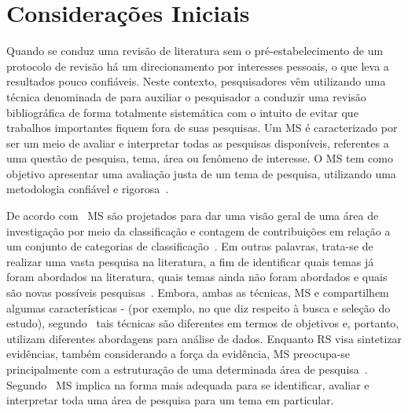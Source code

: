 \section{Considerações Iniciais}

Quando se conduz uma revisão de literatura sem o pré-estabelecimento de um protocolo de revisão há um direcionamento por interesses pessoais, o que leva a resultados pouco confiáveis. Neste contexto, pesquisadores vêm utilizando uma técnica denominada de  para auxiliar o pesquisador a conduzir uma revisão bibliográfica de forma totalmente sistemática com o intuito de evitar que trabalhos importantes fiquem fora de suas pesquisas. Um MS é caracterizado por ser um meio de avaliar e interpretar todas as pesquisas disponíveis, referentes a uma questão de pesquisa, tema, área ou fenômeno de interesse. O MS tem como objetivo apresentar uma avaliação justa de um tema de pesquisa, utilizando uma metodologia confiável e rigorosa~\cite{Petersen_2008, Kitchenham_2010, Petersen_20151}.


De acordo com~ MS são projetados para dar uma visão geral de uma área de investigação por meio da classificação e contagem de contribuições em relação a um conjunto de categorias de classificação~\cite{Petersen_2008, Kitchenham_2010}. Em outras palavras, trata-se de realizar uma vasta pesquisa na literatura, a fim de identificar quais temas já foram abordados na literatura, quais temas ainda não foram abordados e quais são novas possíveis pesquisas~\cite{Kitchenham_2010}. Embora, ambas as técnicas, MS e  compartilhem algumas características - (por exemplo, no que diz respeito à busca e seleção do estudo), segundo~ tais técnicas são diferentes em termos de objetivos e, portanto, utilizam diferentes abordagens para análise de dados. Enquanto RS visa sintetizar evidências, também considerando a força da evidência, MS preocupa-se principalmente com a estruturação de uma determinada área de pesquisa~\cite{Petersen_20151}. Segundo~ MS implica na forma mais adequada para se identificar, avaliar e interpretar toda uma área de pesquisa para um tema em particular. 

